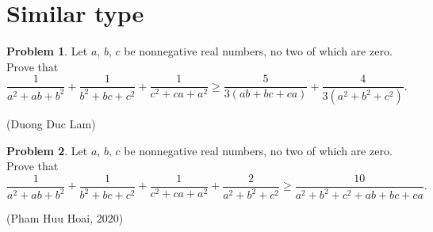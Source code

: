 \documentclass[12pt,a4paper]{book}
\theoremstyle{definition}
\newtheorem{pro}{\cmss\problemColor Problem}
\begin{document}
\section{Similar type}

\begin{pro}
Let $a,\,b,\,c$ be nonnegative real numbers, no two of which are zero. Prove that
$$\frac{1}{a^2+a b+b^2}+\frac{1}{b^2+b c+c^2}+\frac{1}{c^2+c a+a^2} \geqslant \frac{5}{3(ab+bc+ca)}+\frac{4}{3\left(a^2+b^2+c^2\right)}.$$
\begin{flushright}
(Duong Duc Lam)
\end{flushright}
\end{pro}

\begin{pro}
Let $a,\,b,\,c$ be nonnegative real numbers, no two of which are zero. Prove that
$$\frac{1}{a^2+a b+b^2}+\frac{1}{b^2+b c+c^2}+\frac{1}{c^2+c a+a^2}+\frac{2}{a^2+b^2+c^2} \geq \frac{10}{a^2+b^2+c^2+a b+b c+c a}.$$
\begin{flushright}
(Pham Huu Hoai, $2020$)
\end{flushright}
\end{pro}
\end{document}

